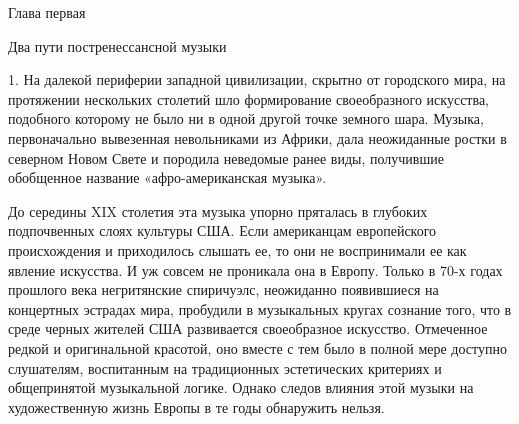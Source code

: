 Глава первая

Два пути постренессансной музыки

1. На  далекой периферии  западной цивилизации, скрытно  от городского
мира, на протяжении нескольких столетий шло формирование своеобразного
искусства, подобного которому не было  ни в одной другой точке земного
шара. Музыка,  первоначально вывезенная  невольниками из  Африки, дала
неожиданные ростки в  северном Новом Свете и  породила неведомые ранее
виды, получившие обобщенное название «афро-американская музыка».

До  середины  XIX столетия  эта  музыка  упорно пряталась  в  глубоких
подпочвенных  слоях   культуры  США.  Если   американцам  европейского
происхождения  и приходилось  слышать ее,  то они  не воспринимали  ее
как  явление  искусства.  И  уж  совсем не  проникала  она  в  Европу.
Только в 70-х годах  прошлого века негритянские спиричуэлс, неожиданно
появившиеся  на  концертных  эстрадах мира,  пробудили  в  музыкальных
кругах  сознание того,  что  в среде  черных  жителей США  развивается
своеобразное искусство. Отмеченное редкой и оригинальной красотой, оно
вместе с  тем было в  полной мере доступно слушателям,  воспитанным на
традиционных эстетических критериях и общепринятой музыкальной логике.
Однако следов влияния этой музыки  на художественную жизнь Европы в те
годы обнаружить нельзя.

